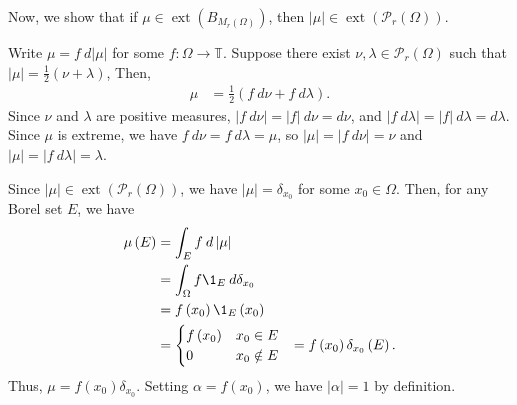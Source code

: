 \documentclass[10pt]{mypackage}
\begin{document}
\begin{example}
  Now, we show that if $\mu\in \operatorname{ext}\left( B_{M_r\left( \Omega \right)} \right)$, then $\left\vert \mu \right\vert\in \operatorname{ext}\left( \mathcal{P}_{r}\left( \Omega \right) \right)$.\newline

  Write $\mu = f\:d\left\vert \mu \right\vert$ for some $f\colon \Omega\rightarrow \mathbb{T}$. Suppose there exist $\nu,\lambda\in \mathcal{P}_{r}\left( \Omega \right)$ such that $\left\vert \mu \right\vert = \frac{1}{2}\left( \nu + \lambda \right)$, Then,
  \begin{align*}
    \mu &= \frac{1}{2}\left( f\:d\nu + f\:d\lambda \right).
  \end{align*}
  Since $\nu$ and $\lambda$ are positive measures, $\left\vert f\:d\nu \right\vert = \left\vert f \right\vert\:d\nu = d\nu$, and $\left\vert f\:d\lambda \right\vert = \left\vert f \right\vert\:d\lambda = d\lambda$. Since $\mu$ is extreme, we have $f\:d\nu = f\:d\lambda = \mu$, so $\left\vert \mu \right\vert = \left\vert f\:d\nu \right\vert = \nu$ and $\left\vert \mu \right\vert = \left\vert f\:d\lambda \right\vert = \lambda$.\newline

  Since $\left\vert \mu \right\vert \in \operatorname{ext}\left( \mathcal{P}_{r}\left( \Omega \right) \right)$, we have $\left\vert \mu \right\vert = \delta_{x_0}$ for some $x_0\in\Omega$. Then, for any Borel set $E$, we have
  \begin{align*}
    \mu\left( E \right) &= \int_{E}^{} f\:d\left\vert \mu \right\vert\\
                        &= \int_{\Omega}^{} f\1_{E}\:d\delta_{x_0}\\
                        &= f\left( x_0 \right)\1_{E}\left( x_0 \right)\\
                        &= \begin{cases}
                          f\left( x_0 \right) & x_0\in E\\
                          0 & x_0\notin E
                        \end{cases}
                        &= f\left( x_0 \right)\delta_{x_0}\left( E \right).
  \end{align*}
  Thus, $\mu = f\left( x_0 \right)\delta_{x_0}$. Setting $\alpha = f\left( x_0 \right)$, we have $\left\vert \alpha \right\vert = 1$ by definition.
\end{example}
\end{document}

